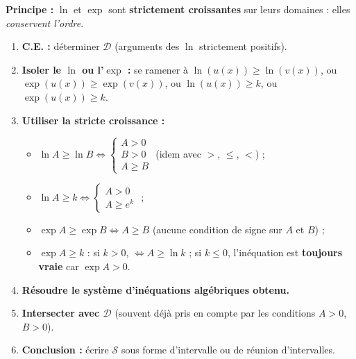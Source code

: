 \documentclass[11pt]{article}
\begin{document}
\begin{methode}
\textbf{Principe :} $\ln$ et $\exp$ sont \textbf{strictement croissantes} sur leurs domaines : elles \emph{conservent l'ordre}.
\begin{enumerate}
    \item \textbf{C.E. :} déterminer $\mathcal{D}$ (arguments des $\ln$ strictement positifs).
    \item \textbf{Isoler le $\ln$ ou l'$\exp$ :} se ramener à $\ln(u(x)) \geqslant \ln(v(x))$, ou $\exp(u(x)) \geqslant \exp(v(x))$, ou $\ln(u(x)) \geqslant k$, ou $\exp(u(x)) \geqslant k$.
    \item \textbf{Utiliser la stricte croissance :}
    \begin{itemize}
        \item $\ln A \geqslant \ln B \iff \begin{cases} A > 0 \\ B > 0 \\ A \geqslant B \end{cases}$ (idem avec $>$, $\leqslant$, $<$) ;
        \item $\ln A \geqslant k \iff \begin{cases} A > 0 \\ A \geqslant e^k \end{cases}$ ;
        \item $\exp A \geqslant \exp B \iff A \geqslant B$ (aucune condition de signe sur $A$ et $B$) ;
        \item $\exp A \geqslant k$ : si $k>0$, $\iff A \geqslant \ln k$ ; si $k\leqslant 0$, l'inéquation est \textbf{toujours vraie} car $\exp A > 0$.
    \end{itemize}
    \item \textbf{Résoudre le système d'inéquations algébriques obtenu.}
    \item \textbf{Intersecter avec $\mathcal{D}$} (souvent déjà pris en compte par les conditions $A>0$, $B>0$).
    \item \textbf{Conclusion :} écrire $\mathcal{S}$ sous forme d'intervalle ou de réunion d'intervalles.
\end{enumerate}
\end{methode}
\end{document}
